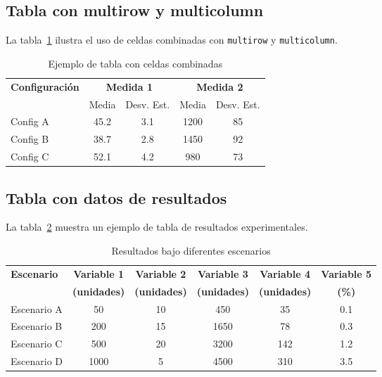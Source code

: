 \documentclass[a4paper,11pt]{report}
\begin{document}
\begin{appendices}
\subsection{Tabla con multirow y multicolumn}

La tabla~\ref{tab:compleja} ilustra el uso de celdas combinadas con \texttt{multirow} y \texttt{multicolumn}.

\begin{table}[htbp]
  \centering
  \caption{Ejemplo de tabla con celdas combinadas}
  \label{tab:compleja}
  \begin{tabular}{lcccc}
    \toprule
    \multirow{2}{*}{\textbf{Configuración}} & \multicolumn{2}{c}{\textbf{Medida 1}} & \multicolumn{2}{c}{\textbf{Medida 2}} \\
    \cmidrule(lr){2-3} \cmidrule(lr){4-5}
    & Media & Desv. Est. & Media & Desv. Est. \\
    \midrule
    Config A & 45.2 & 3.1 & 1200 & 85 \\
    Config B & 38.7 & 2.8 & 1450 & 92 \\
    Config C & 52.1 & 4.2 & 980 & 73 \\
    \bottomrule
  \end{tabular}
\end{table}

\subsection{Tabla con datos de resultados}

La tabla~\ref{tab:resultados} muestra un ejemplo de tabla de resultados experimentales.

\begin{table}[htbp]
  \centering
  \caption{Resultados bajo diferentes escenarios}
  \label{tab:resultados}
  \begin{tabular}{lccccc}
    \toprule
    \multirow{2}{*}{\textbf{Escenario}} & \textbf{Variable 1} & \textbf{Variable 2} & \textbf{Variable 3} & \textbf{Variable 4} & \textbf{Variable 5} \\
    & \textbf{(unidades)} & \textbf{(unidades)} & \textbf{(unidades)} & \textbf{(unidades)} & \textbf{(\%)} \\
    \midrule
    Escenario A & 50 & 10 & 450 & 35 & 0.1 \\
    Escenario B & 200 & 15 & 1650 & 78 & 0.3 \\
    Escenario C & 500 & 20 & 3200 & 142 & 1.2 \\
    Escenario D & 1000 & 5 & 4500 & 310 & 3.5 \\
    \bottomrule
  \end{tabular}
\end{table}


\end{appendices}
\end{document}

